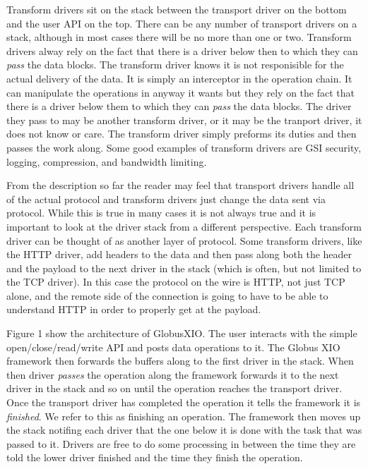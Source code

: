 \documentclass[11pt]{article}
\begin{document}
Transform drivers sit on the stack between the transport driver on the
bottom and the user API on the top.  There can be any number of transport
drivers on a stack, although in most cases there will be no more than one or 
two.  Transform drivers alway rely on the fact that there is a driver
below then to which they can \emph{pass} the data blocks.  The transform
driver knows it is not responisible for the actual delivery of the data.
It is simply an interceptor in the operation chain.  It can manipulate
the operations in anyway it wants but they rely on the fact that there is
a driver below them to which they can \emph{pass} the data blocks.  The 
driver they pass to may be another transform driver, or it may be the
tranport driver, it does not know or care.  The transform driver simply
preforms its duties and then passes the work along.  Some good examples
of transform drivers are GSI security, logging, compression, 
and bandwidth limiting.

From the description so far the reader may feel that transport drivers
handle all of the actual protocol and transform drivers just change the
data sent via protocol.  While this is true in many cases
it is not always true and it is important to look at the driver
stack from a different perspective.  Each transform driver can be 
thought of as another layer of protocol.  Some transform drivers, like the
HTTP driver, add headers to the data and then pass along both the
header and the payload to the next driver in the stack (which is often,
but not limited to the TCP driver).  In this case the protocol on the
wire is HTTP, not just TCP alone, and the remote side of the connection is
going to have to be able to understand HTTP in order to properly get
at the payload.

Figure 1 show the architecture of GlobusXIO.  The user interacts with 
the simple open/close/read/write API and posts data operations to it.
The Globus XIO framework then forwards the buffers along to the first
driver in the stack.  When then driver \emph{passes} the operation along
the framework forwards it to the next driver in the stack and so on
until the operation reaches the transport driver.  Once the transport 
driver has completed the operation it tells the framework it is 
\emph{finished}.  We refer to this as finishing an operation.  The 
framework then moves up the stack notifing each driver that the 
one below it is done with the task that was passed to it.  Drivers
are free to do some processing in between the time they are told
the lower driver finished and the time they finish the operation.
\end{document}
